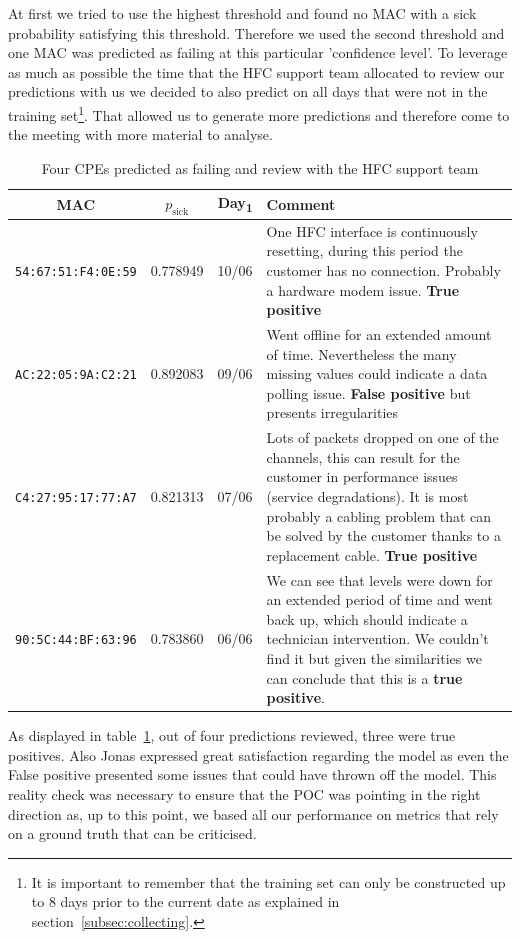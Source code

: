 At first we tried to use the highest threshold and found no MAC with a sick probability satisfying this threshold. Therefore we used the second threshold and one MAC was predicted as failing at this particular 'confidence level'. To leverage as much as possible the time that the HFC support team allocated to review our predictions with us we decided to also predict on all days that were not in the training set\footnote{It is important to remember that the training  set can only be constructed up to 8 days prior to the current date as explained in section~\ref{subsec:collecting}.}. That allowed us to generate more predictions and therefore come to the meeting with more material to analyse.

\begin{table}[h]
\begin{center}
\begin{tabular}{c c c p{90mm}}
\hline
\textbf{MAC} & \textbf{$p_\text{sick}$} & \textbf{Day\textsubscript{1}} & \textbf{Comment} \\ 
\hline\hline
\texttt{54:67:51:F4:0E:59} & 0.778949 & 10/06 & One HFC interface is continuously resetting, during this period the customer has no connection. Probably a hardware modem issue. \textbf{True positive}\\
\hline
\texttt{AC:22:05:9A:C2:21} & 0.892083 & 09/06 & Went offline for an extended amount of time. Nevertheless the many missing values could indicate a data polling issue. \textbf{False positive} but presents irregularities\\
\hline
\texttt{C4:27:95:17:77:A7} & 0.821313 & 07/06 & Lots of packets dropped on one of the channels, this can result for the customer in performance issues (service degradations). It is most probably a cabling problem that can be solved by the customer thanks to a replacement cable. \textbf{True positive}\\
\hline
\texttt{90:5C:44:BF:63:96} & 0.783860 & 06/06 &  We can see that levels were down for an extended period of time and went back up, which should indicate a technician intervention. We couldn't find it but given the similarities we can conclude that this is a \textbf{true positive}.\\
\end{tabular}
\end{center}
\caption{\label{checks} Four CPEs predicted as failing and review with the HFC support team}
\end{table}

As displayed in table~\ref{checks}, out of four predictions reviewed, three were true positives. Also Jonas expressed great satisfaction regarding the model as even the False positive presented some issues that could have thrown off the model. This reality check was necessary to ensure that the POC was pointing in the right direction as, up to this point, we based all our performance on metrics that rely on a ground truth that can be criticised. 

